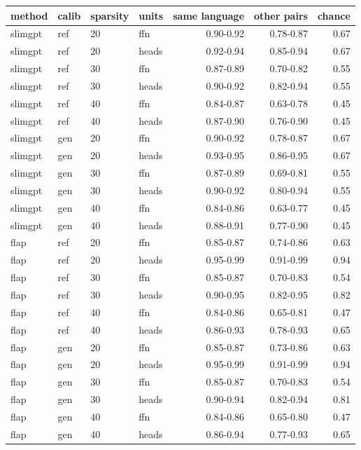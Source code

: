 \begin{tabular}{llllrrr}
\toprule
method & calib & sparsity & units & same language & other pairs & chance \\
\midrule
slimgpt & ref & 20 & ffn & 0.90-0.92 & 0.78-0.87 & 0.67 \\
slimgpt & ref & 20 & heads & 0.92-0.94 & 0.85-0.94 & 0.67 \\
slimgpt & ref & 30 & ffn & 0.87-0.89 & 0.70-0.82 & 0.55 \\
slimgpt & ref & 30 & heads & 0.90-0.92 & 0.82-0.94 & 0.55 \\
slimgpt & ref & 40 & ffn & 0.84-0.87 & 0.63-0.78 & 0.45 \\
slimgpt & ref & 40 & heads & 0.87-0.90 & 0.76-0.90 & 0.45 \\
slimgpt & gen & 20 & ffn & 0.90-0.92 & 0.78-0.87 & 0.67 \\
slimgpt & gen & 20 & heads & 0.93-0.95 & 0.86-0.95 & 0.67 \\
slimgpt & gen & 30 & ffn & 0.87-0.89 & 0.69-0.81 & 0.55 \\
slimgpt & gen & 30 & heads & 0.90-0.92 & 0.80-0.94 & 0.55 \\
slimgpt & gen & 40 & ffn & 0.84-0.86 & 0.63-0.77 & 0.45 \\
slimgpt & gen & 40 & heads & 0.88-0.91 & 0.77-0.90 & 0.45 \\
flap & ref & 20 & ffn & 0.85-0.87 & 0.74-0.86 & 0.63 \\
flap & ref & 20 & heads & 0.95-0.99 & 0.91-0.99 & 0.94 \\
flap & ref & 30 & ffn & 0.85-0.87 & 0.70-0.83 & 0.54 \\
flap & ref & 30 & heads & 0.90-0.95 & 0.82-0.95 & 0.82 \\
flap & ref & 40 & ffn & 0.84-0.86 & 0.65-0.81 & 0.47 \\
flap & ref & 40 & heads & 0.86-0.93 & 0.78-0.93 & 0.65 \\
flap & gen & 20 & ffn & 0.85-0.87 & 0.73-0.86 & 0.63 \\
flap & gen & 20 & heads & 0.95-0.99 & 0.91-0.99 & 0.94 \\
flap & gen & 30 & ffn & 0.85-0.87 & 0.70-0.83 & 0.54 \\
flap & gen & 30 & heads & 0.90-0.94 & 0.82-0.94 & 0.81 \\
flap & gen & 40 & ffn & 0.84-0.86 & 0.65-0.80 & 0.47 \\
flap & gen & 40 & heads & 0.86-0.94 & 0.77-0.93 & 0.65 \\
\bottomrule
\end{tabular}

